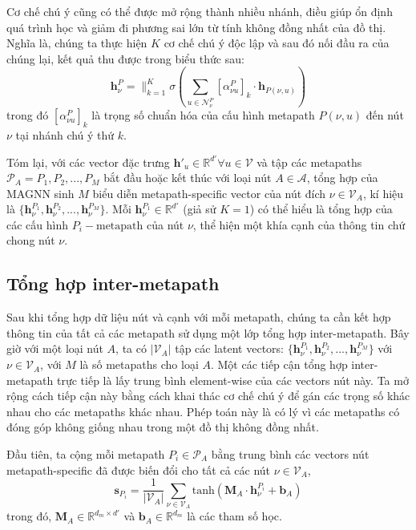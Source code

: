 Cơ chế chú ý cũng có thể được mở rộng thành nhiều nhánh, điều giúp ổn định quá trình học và giảm đi phương sai lớn từ tính không đồng nhất của đồ thị. Nghĩa là, chúng ta thực hiện $K$ cơ chế chú ý độc lập và sau đó nối đầu ra của chúng lại, kết quả thu được trong biểu thức sau:
\begin{equation}
  \mathbf{h}^P_{\nu} = \parallel ^K_{k=1} \sigma \left( \sum_{u \in \pmb{\mathcal{N}}^P_{\nu}} \left[ \alpha ^P_{\nu u} \right]_k \cdot \mathbf{h}_{P(\nu, u)} \right)
\end{equation} 
trong đó $\left[ \alpha ^P_{\nu u} \right]_k$ là trọng số chuẩn hóa của cấu hình metapath $P(\nu, u)$ đến nút $\nu$ tại nhánh chú ý thứ $k$.

Tóm lại, với các vector đặc trưng $\mathbf{h'}_{u} \in \mathbb{R}^{d'} \forall u \in \pmb{\mathcal{V}}$ và tập các metapaths $\pmb{\mathcal{P}}_A = {P_1, P_2, ..., P_M}$ bắt đầu hoặc kết thúc với loại nút $A \in \pmb{\mathcal{A}}$, tổng hợp của MAGNN sinh $M$ biểu diễn metapath-specific vector của nút đích $\nu \in \pmb{\mathcal{V}}_A$, kí hiệu là $\{ \mathbf{h}^{P_1}_{\nu}, \mathbf{h}^{P_2}_{\nu}, ... , \mathbf{h}^{P_M}_{\nu} \}$. Mỗi $\mathbf{h}^{P_1}_{\nu} \in \mathbb{R}^{d'}$ (giả sử $K=1$) có thể hiểu là tổng hợp của các cấu hình $P_i-\text{metapath}$ của nút $\nu$, thể hiện một khía cạnh của thông tin chứ chong nút $\nu$.

\subsection{Tổng hợp inter-metapath}
Sau khi tổng hợp dữ liệu nút và cạnh với mỗi metapath, chúng ta cần kết hợp thông tin của tất cả các metapath sử dụng một lớp tổng hợp inter-metapath. Bây giờ với một loại nút $A$, ta có $|\pmb{\mathcal{V}}_A|$ tập các latent vectors: $\{ \mathbf{h}^{P_1}_{\nu}, \mathbf{h}^{P_2}_{\nu}, ... , \mathbf{h}^{P_M}_{\nu} \}$ với $\nu \in \pmb{\mathcal{V}}_A$, với $M$ là số metapaths cho loại $A$. Một các tiếp cận tổng hợp inter-metapath trực tiếp là lấy trung bình element-wise của các vectors nút này. Ta mở rộng cách tiếp cận này bằng cách khai thác cơ chế chú ý để gán các trọng số khác nhau cho các metapaths khác nhau. Phép toán này là có lý vì các metapaths có đóng góp không giống nhau trong một đồ thị không đồng nhất.

Đầu tiên, ta cộng mỗi metapath $P_i \in \pmb{\mathcal{P}}_A$ bằng trung bình các vectors nút metapath-specific đã được biến đổi cho tất cả các nút $\nu \in \pmb{\mathcal{V}}_A$,
\begin{equation}
  \mathbf{s}_{P_i} = \frac{1}{|\pmb{\mathcal{V}}_A|} \sum_{\nu \in \pmb{\mathcal{V}}_A} \text{tanh} \left( \mathbf{M}_A \cdot \mathbf{h}^{P_i}_{\nu} + \mathbf{b}_A \right)
\end{equation}
trong đó, $\mathbf{M}_A \in \mathbb{R}^{d_m \times d'}$ và $\mathbf{b}_A \in \mathbb{R}^{d_m}$ là các tham số học.

